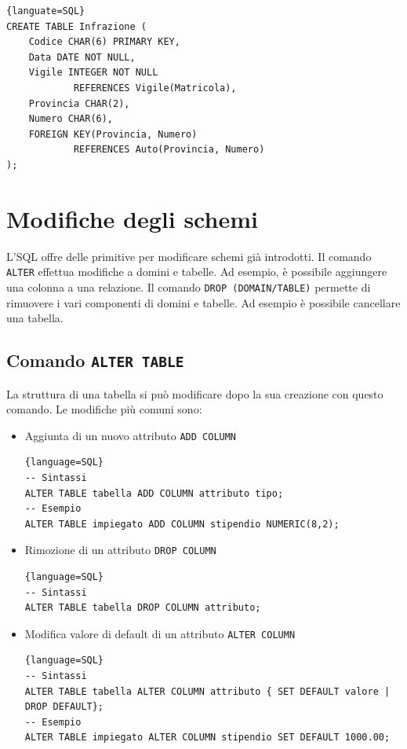 \documentclass[11pt]{report}
\begin{document}
\begin{lstlisting}{languate=SQL}
CREATE TABLE Infrazione (
	Codice CHAR(6) PRIMARY KEY,
	Data DATE NOT NULL, 
	Vigile INTEGER NOT NULL
			REFERENCES Vigile(Matricola), 
	Provincia CHAR(2), 
	Numero CHAR(6), 
	FOREIGN KEY(Provincia, Numero)
			REFERENCES Auto(Provincia, Numero)
);
\end{lstlisting}

\section{Modifiche degli schemi}

L'SQL offre delle primitive per modificare schemi gi\`a introdotti. Il comando \texttt{ALTER} effettua modifiche a domini e tabelle. Ad esempio, \`e possibile aggiungere una colonna a una relazione.
Il comando \texttt{DROP (DOMAIN/TABLE)} permette di rimuovere i vari componenti di domini e tabelle. Ad esempio \`e possibile cancellare una tabella.

\subsection{Comando \texttt{ALTER TABLE}}

La struttura di una tabella si pu\`o modificare dopo la sua creazione con questo comando. Le modifiche pi\`u comuni sono: 

\begin{itemize}
\item Aggiunta di un nuovo attributo \texttt{ADD COLUMN}
\begin{lstlisting}{language=SQL}
-- Sintassi
ALTER TABLE tabella ADD COLUMN attributo tipo;
-- Esempio
ALTER TABLE impiegato ADD COLUMN stipendio NUMERIC(8,2);
\end{lstlisting}
\item Rimozione di un attributo \texttt{DROP COLUMN}
\begin{lstlisting}{language=SQL}
-- Sintassi
ALTER TABLE tabella DROP COLUMN attributo;
\end{lstlisting}
\item Modifica valore di default di un attributo \texttt{ALTER COLUMN}
\begin{lstlisting}{language=SQL}
-- Sintassi
ALTER TABLE tabella ALTER COLUMN attributo { SET DEFAULT valore | DROP DEFAULT};
-- Esempio
ALTER TABLE impiegato ALTER COLUMN stipendio SET DEFAULT 1000.00;
\end{lstlisting}
\end{itemize}
\end{document}
